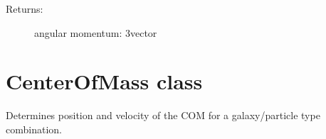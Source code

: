 \documentclass[letterpaper,10pt,english]{sphinxmanual}
\begin{document}
\begin{fulllineitems}
\begin{fulllineitems}
\begin{description}
\item[{Returns:}] \leavevmode
angular momentum: 3\sphinxhyphen{}vector

\end{description}

\end{fulllineitems}


\end{fulllineitems}

\label{\detokenize{centerofmass:module-galaxy.centerofmass}}

\chapter{CenterOfMass class}
\label{\detokenize{centerofmass:centerofmass-class}}\label{\detokenize{centerofmass::doc}}
Determines position and velocity of the COM for a galaxy/particle
type combination.
\end{document}

